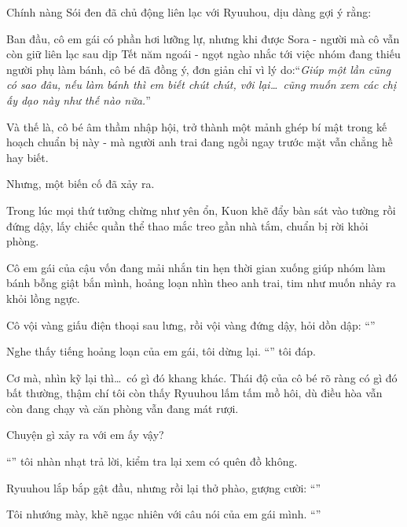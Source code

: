 \documentclass[../main.tex]{subfiles}
\begin{document}
Chính nàng Sói đen đã chủ động liên lạc với Ryuuhou, dịu dàng gợi ý rằng:


Ban đầu, cô em gái có phần hơi lưỡng lự, nhưng khi được Sora - người mà cô vẫn còn giữ liên lạc sau dịp Tết năm ngoái - ngọt ngào nhắc tới việc nhóm đang thiếu người phụ làm bánh, cô bé đã đồng ý, đơn giản chỉ vì lý do:``\textit{Giúp một lần cũng có sao đâu, nếu làm bánh thì em biết chút chút, với lại\dots\ cũng muốn xem các chị ấy dạo này như thế nào nữa.}''

Và thế là, cô bé âm thầm nhập hội, trở thành một mảnh ghép bí mật trong kế hoạch chuẩn bị này - mà người anh trai đang ngồi ngay trước mặt vẫn chẳng hề hay biết.

Nhưng, một biến cố đã xảy ra.

Trong lúc mọi thứ tưởng chừng như yên ổn, Kuon khẽ đẩy bàn sát vào tường rồi đứng dậy, lấy chiếc quần thể thao mắc treo gần nhà tắm, chuẩn bị rời khỏi phòng.

Cô em gái của cậu vốn đang mải nhắn tin hẹn thời gian xuống giúp nhóm làm bánh bỗng giật bắn mình, hoảng loạn nhìn theo anh trai, tim như muốn nhảy ra khỏi lồng ngực.

Cô vội vàng giấu điện thoại sau lưng, rồi vội vàng đứng dậy, hỏi dồn dập: ``''


Nghe thấy tiếng hoảng loạn của em gái, tôi dừng lại. ``'' tôi đáp.

Cơ mà, nhìn kỹ lại thì\dots\ có gì đó khang khác. Thái độ của cô bé rõ ràng có gì đó bất thường, thậm chí tôi còn thấy Ryuuhou lấm tấm mồ hôi, dù điều hòa vẫn còn đang chạy và căn phòng vẫn đang mát rượi.

Chuyện gì xảy ra với em ấy vậy?

``'' tôi nhàn nhạt trả lời, kiểm tra lại xem có quên đồ không.

Ryuuhou lắp bắp gật đầu, nhưng rồi lại thở phào, gượng cười: ``''

Tôi nhướng mày, khẽ ngạc nhiên với câu nói của em gái mình. ``''
\end{document}
